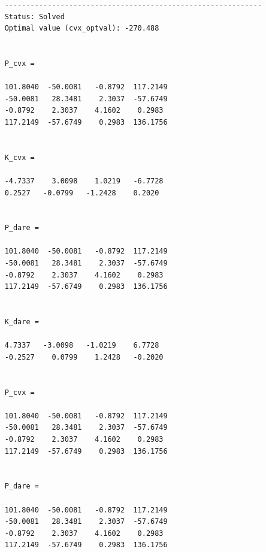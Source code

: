 \documentclass[letter]{article}
\begin{document}
\begin{Verbatim}
	------------------------------------------------------------
	Status: Solved
	Optimal value (cvx_optval): -270.488
	
	
	P_cvx =
	
	101.8040  -50.0081   -0.8792  117.2149
	-50.0081   28.3481    2.3037  -57.6749
	-0.8792    2.3037    4.1602    0.2983
	117.2149  -57.6749    0.2983  136.1756
	
	
	K_cvx =
	
	-4.7337    3.0098    1.0219   -6.7728
	0.2527   -0.0799   -1.2428    0.2020
	
	
	P_dare =
	
	101.8040  -50.0081   -0.8792  117.2149
	-50.0081   28.3481    2.3037  -57.6749
	-0.8792    2.3037    4.1602    0.2983
	117.2149  -57.6749    0.2983  136.1756
	
	
	K_dare =
	
	4.7337   -3.0098   -1.0219    6.7728
	-0.2527    0.0799    1.2428   -0.2020
	
	
	P_cvx =
	
	101.8040  -50.0081   -0.8792  117.2149
	-50.0081   28.3481    2.3037  -57.6749
	-0.8792    2.3037    4.1602    0.2983
	117.2149  -57.6749    0.2983  136.1756
	
	
	P_dare =
	
	101.8040  -50.0081   -0.8792  117.2149
	-50.0081   28.3481    2.3037  -57.6749
	-0.8792    2.3037    4.1602    0.2983
	117.2149  -57.6749    0.2983  136.1756
\end{Verbatim}



%
%
\end{document}
